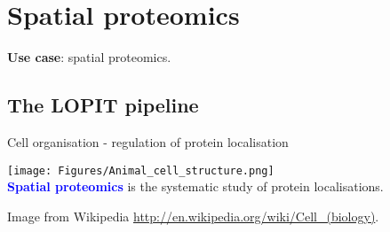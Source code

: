 \section{Spatial proteomics}

\begin{frame}{}
  \begin{center}
    \Large{\textbf{Use case}: spatial proteomics.}
  \end{center}
\end{frame}

\subsection*{The LOPIT pipeline}

\label{sec:spintro}


\label{sec:spspatprot}

\begin{frame}{Cell organisation - regulation of protein localisation}
  \begin{center}
    \texttt{[image: Figures/Animal\_cell\_structure.png]} \\
    \textbf{\textcolor{Blue}{Spatial proteomics}} is the systematic
    study of protein localisations.
  \end{center}

  \tiny Image from Wikipedia
  \url{http://en.wikipedia.org/wiki/Cell_(biology)}.
\end{frame}


